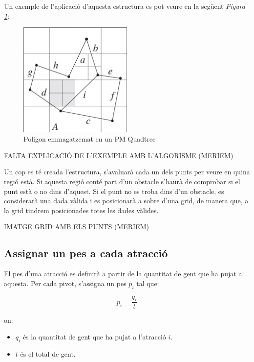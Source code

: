 \documentclass[12pt]{article}
\begin{document}
Un exemple de l'aplicació d'aquesta estructura es pot veure en la següent \textit{Figura \ref{fig:poligon_pm_quadtree}}:

\begin{figure}[H]
	\centering
	\includegraphics[width=0.5\textwidth]{imatges/pm_quadtree.png}\par\vspace{1cm}
	\caption{Poligon emmagatzemat en un PM Quadtree}
	\label{fig:poligon_pm_quadtree}
\end{figure}

FALTA EXPLICACIÓ DE L'EXEMPLE AMB L'ALGORISME (MERIEM)

Un cop es té creada l'estructura, s'avaluarà cada un dels punts per veure en quina regió està. Si aquesta regió conté part d'un obstacle s'haurà de comprobar si el punt està o no dins d'aquest. Si el punt no es troba dins d'un obstacle, es considerarà una dada vàlida i es posicionarà a sobre d'una grid, de manera que, a la grid tindrem posicionades totes les dades vàlides.

IMATGE GRID AMB ELS PUNTS (MERIEM)

\subsection{Assignar un pes a cada atracció}
El pes d'una atracció es definirà a partir de la quantitat de gent que ha pujat a aquesta. Per cada pivot, s'assigna un pes $p_{i}$ tal que:
 
$$p_{i} = \frac{q_{i}}{t}$$

on:
\begin{itemize}
	\item $q_{i}$ és la quantitat de gent que ha pujat a l'atracció $i$.
	\item $t$ és el total de gent.
\end{itemize}
\end{document}

